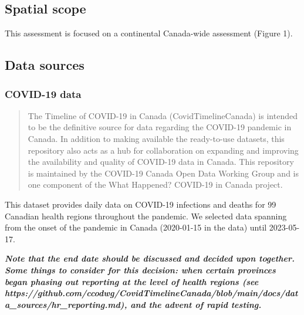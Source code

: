 \documentclass[preprint, 3p,
authoryear]{elsarticle} %
\begin{document}
\hypertarget{spatial-scope}{%
\subsection{Spatial scope}\label{spatial-scope}}

This assessment is focused on a continental Canada-wide assessment
(Figure 1).

\hypertarget{data-sources}{%
\subsection{Data sources}\label{data-sources}}

\hypertarget{covid-19-data}{%
\subsubsection{COVID-19 data}\label{covid-19-data}}

\begin{quote}
The Timeline of COVID-19 in Canada (CovidTimelineCanada) is intended to
be the definitive source for data regarding the COVID-19 pandemic in
Canada. In addition to making available the ready-to-use datasets, this
repository also acts as a hub for collaboration on expanding and
improving the availability and quality of COVID-19 data in Canada. This
repository is maintained by the COVID-19 Canada Open Data Working Group
and is one component of the What Happened? COVID-19 in Canada project.
\end{quote}

This dataset provides daily data on COVID-19 infections and deaths for
99 Canadian health regions throughout the pandemic. We selected data
spanning from the onset of the pandemic in Canada (2020-01-15 in the
data) until 2023-05-17.

\textbf{\emph{Note that the end date should be discussed and decided
upon together. Some things to consider for this decision: when certain
provinces began phasing out reporting at the level of health regions
(see
https://github.com/ccodwg/CovidTimelineCanada/blob/main/docs/data\_sources/hr\_reporting.md),
and the advent of rapid testing.}}
\end{document}
